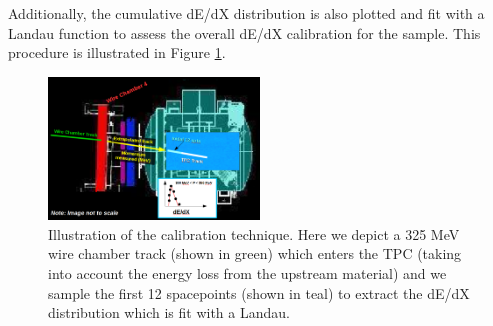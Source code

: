 \begin{itemize}
Additionally, the cumulative dE/dX distribution is also plotted and fit with a Landau function to assess the overall dE/dX calibration for the sample. This procedure is illustrated in Figure \ref{fig:CalibrationExample}.

\end{itemize}

\begin{figure}[htb]
\centering
\includegraphics[width=0.50\textwidth]{images/CalibrationExample.png}
\caption{Illustration of the calibration technique. Here we depict a 325 MeV wire chamber track (shown in green) which enters the TPC (taking into account the energy loss from the upstream material) and we sample the first 12 spacepoints (shown in teal) to extract the dE/dX distribution which is fit with a Landau.}
\label{fig:CalibrationExample}
\end{figure}

